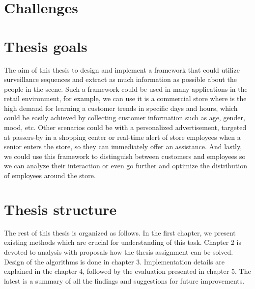 \begin{introduction}
\section{Challenges}
\section{Thesis goals}
    The aim of this thesis to design and implement a framework that could utilize surveillance sequences and extract as much information as possible about the people in the scene.
    Such a framework could be used in many applications in the retail environment, for example, we can use it is a commercial store where is the high demand for learning a customer trends in specific days and hours, which could be easily achieved by collecting customer information such as age, gender, mood, etc. Other scenarios could be with a personalized advertisement, targeted at passers-by in a shopping center or real-time alert of store employees when a senior enters the store, so they can immediately offer an assistance. And lastly, we could use this framework to distinguish between customers and employees so we can analyze their interaction or even go further and optimize the distribution of employees around the store.
  
\section{Thesis structure}
    The rest of this thesis is organized as follows. In the first chapter, we present existing methods which are crucial for understanding of this task. Chapter 2 is devoted to analysis with proposals how the thesis assignment can be solved. Design of the algorithms is done in chapter 3. Implementation details are explained in the chapter 4, followed by the evaluation presented in chapter 5. The latest is a summary of all the findings and suggestions for future improvements.
    
\end{introduction}
